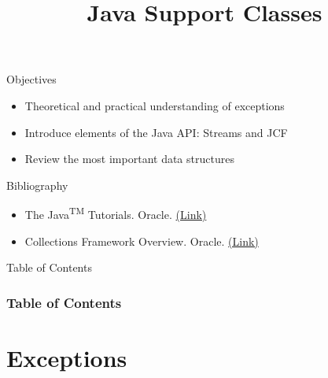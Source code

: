 \documentclass[10pt,compress]{beamer} %
\title[Java Support Classes]{Java Support Classes}
\author{}
\institute{\asignatura}
\date{}
\begin{document}
{\titlepageBlue
    \begin{frame}
        \titlepage
    \end{frame}
}

\begin{frame}[plain]{}
   \begin{block}{Objectives}
      \begin{itemize}
	\item Theoretical and practical understanding of exceptions
	\item Introduce elements of the Java API: Streams and JCF
        \item Review the most important data structures
      \end{itemize} 
   \end{block}

   \begin{block}{Bibliography}
      \begin{itemize}
          \item The Java\textsuperscript{TM} Tutorials. Oracle. \href{https://docs.oracle.com/javase/tutorial/}{(Link)}
          \item Collections Framework Overview. Oracle. \href{http://docs.oracle.com/javase/7/docs/technotes/guides/collections/overview.html}{(Link)}
      \end{itemize} 
   \end{block}
\end{frame}

{
\eliminarNavegacion
\begin{frame}[shrink]{Table of Contents}
 \frametitle{Table of Contents}
 \tableofcontents
\end{frame}
}

\section{Exceptions}
\end{document}
